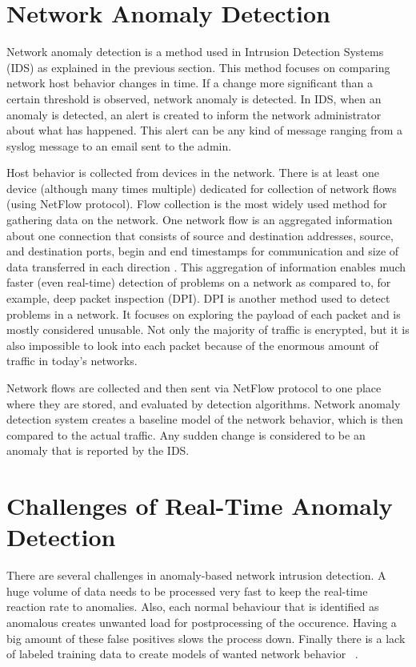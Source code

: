 \documentclass[thesis=B,english]{FITthesis}[2012/10/20]
\begin{document}
\section{Network Anomaly Detection}\label{sec:nbad}
Network anomaly detection is a method used in Intrusion Detection Systems (IDS) as explained in the previous section.
This method focuses on comparing network host behavior changes in time.
If a change more significant than a certain threshold is observed, network anomaly is detected.
In IDS, when an anomaly is detected, an alert is created to inform the network administrator about what has happened.
This alert can be any kind of message ranging from a syslog message to an email sent to the admin.

Host behavior is collected from devices in the network.
There is at least one device (although many times multiple) dedicated for collection of network flows (using NetFlow protocol).
Flow collection is the most widely used method for gathering data on the network.
One network flow is an aggregated information about one connection that consists of source and destination addresses, source, and destination ports, begin and end timestamps for communication and size of data transferred in each direction \cite{rfc2722}.
This aggregation of information enables much faster (even real-time) detection of problems on a network as compared to, for example, deep packet inspection (DPI).
DPI is another method used to detect problems in a network.
It focuses on exploring the payload of each packet and is mostly considered unusable.
Not only the majority of traffic is encrypted, but it is also impossible to look into each packet because of the enormous amount of traffic in today's networks.

Network flows are collected and then sent via NetFlow protocol to one place where they are stored, and evaluated by detection algorithms.
Network anomaly detection system creates a baseline model of the network behavior, which is then compared to the actual traffic.
Any sudden change is considered to be an anomaly that is reported by the IDS.

\section{Challenges of Real-Time Anomaly Detection}\label{sec:challenges}

There are several challenges in anomaly-based network intrusion detection.
A huge volume of data needs to be processed very fast to keep the real-time reaction rate to anomalies.
Also, each normal behaviour that is identified as anomalous creates unwanted load for postprocessing of the occurence.
Having a big amount of these false positives slows the process down.
Finally there is a lack of labeled training data to create models of wanted network behavior ~\cite{grill2016combining}.
\end{document}
